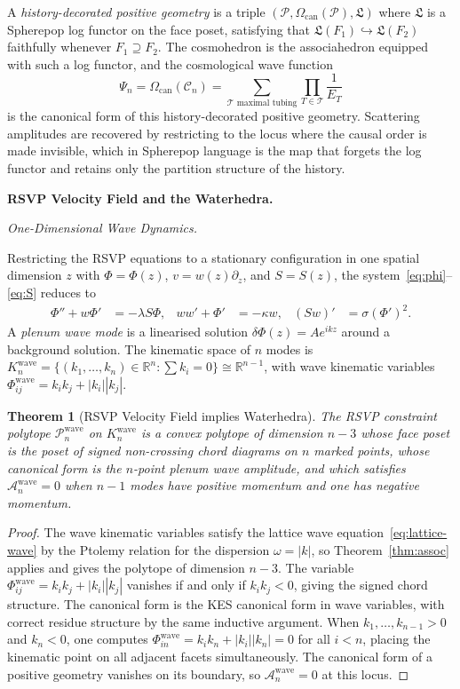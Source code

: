 \documentclass[12pt, oneside]{amsart}
\theoremstyle{plain}
\newtheorem{theorem}{Theorem}[section]
\theoremstyle{definition}
\theoremstyle{remark}
\newcommand{\R}{\mathbb{R}}
\newcommand{\Phif}{\Phi}
\newcommand{\vf}{v}
\newcommand{\Sf}{S}
\newcommand{\Log}{\mathfrak{L}}
\newcommand{\Amp}{\mathcal{A}}
\newcommand{\WF}{\Psi}
\newcommand{\Cosmo}{\mathcal{C}_n}
\newcommand{\CF}{\Omega_{\mathrm{can}}}
\begin{document}
A \emph{history-decorated positive geometry} is a triple $(\mathcal{P}, \CF(\mathcal{P}), \Log)$ where $\Log$ is a Spherepop log functor on the face poset, satisfying that $\Log(F_1) \hookrightarrow \Log(F_2)$ faithfully whenever $F_1 \supseteq F_2$. The cosmohedron is the associahedron equipped with such a log functor, and the cosmological wave function
\[
  \WF_n = \CF(\Cosmo) = \sum_{\mathcal{T}\text{ maximal tubing}} \prod_{T \in \mathcal{T}} \frac{1}{E_T}
\]
is the canonical form of this history-decorated positive geometry. Scattering amplitudes are recovered by restricting to the locus where the causal order is made invisible, which in Spherepop language is the map that forgets the log functor and retains only the partition structure of the history.

\bigskip\noindent\textbf{RSVP Velocity Field and the Waterhedra.}
\label{sec:water}

\medskip\noindent\textit{One-Dimensional Wave Dynamics.}

Restricting the RSVP equations to a stationary configuration in one spatial dimension $z$ with $\Phif = \Phif(z)$, $\vf = w(z)\partial_z$, and $\Sf = \Sf(z)$, the system~\eqref{eq:phi}--\eqref{eq:S} reduces to
\begin{align*}
  \Phif'' + w\Phif' &= -\lambda \Sf\Phif, &
  ww' + \Phif' &= -\kappa w, &
  (\Sf w)' &= \sigma(\Phif')^2.
\end{align*}
A \emph{plenum wave mode} is a linearised solution $\delta\Phif(z) = A e^{ikz}$ around a background solution. The kinematic space of $n$ modes is $K_n^{\mathrm{wave}} = \{(k_1,\ldots,k_n) \in \R^n : \sum k_i = 0\} \cong \R^{n-1}$, with wave kinematic variables $\Phif_{ij}^{\mathrm{wave}} = k_ik_j + |k_i||k_j|$.

\begin{theorem}[RSVP Velocity Field implies Waterhedra]
\label{thm:water}
The RSVP constraint polytope $\mathcal{P}_n^{\mathrm{wave}}$ on $K_n^{\mathrm{wave}}$ is a convex polytope of dimension $n-3$ whose face poset is the poset of signed non-crossing chord diagrams on $n$ marked points, whose canonical form is the $n$-point plenum wave amplitude, and which satisfies $\Amp_n^{\mathrm{wave}} = 0$ when $n-1$ modes have positive momentum and one has negative momentum.
\end{theorem}

\begin{proof}
The wave kinematic variables satisfy the lattice wave equation~\eqref{eq:lattice-wave} by the Ptolemy relation for the dispersion $\omega = |k|$, so Theorem~\ref{thm:assoc} applies and gives the polytope of dimension $n-3$. The variable $\Phif_{ij}^{\mathrm{wave}} = k_ik_j + |k_i||k_j|$ vanishes if and only if $k_ik_j < 0$, giving the signed chord structure. The canonical form is the KES canonical form in wave variables, with correct residue structure by the same inductive argument. When $k_1,\ldots,k_{n-1} > 0$ and $k_n < 0$, one computes $\Phif_{in}^{\mathrm{wave}} = k_i k_n + |k_i||k_n| = 0$ for all $i < n$, placing the kinematic point on all adjacent facets simultaneously. The canonical form of a positive geometry vanishes on its boundary, so $\Amp_n^{\mathrm{wave}} = 0$ at this locus.
\end{proof}
\end{document}
